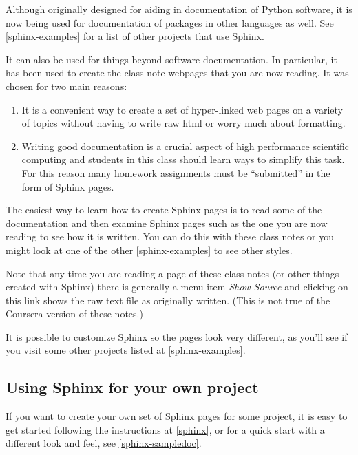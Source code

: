 \documentclass[letterpaper,10pt,english]{sphinxmanual}
\begin{document}
Although originally designed for aiding in documentation of Python software,
it is now being used for documentation of packages in other languages as
well.  See {\hyperref[biblio:sphinx-examples]{{[}sphinx-examples{]}}} for a list of other projects that use Sphinx.

It can also be used for things beyond software documentation.  In
particular, it has been used to create the class note webpages that you are
now reading.  It was chosen for two main reasons:
\begin{enumerate}
\item {} 
It is a convenient way to create a set of hyper-linked web pages on a variety
of topics without having to write raw html or worry much about formatting.

\item {} 
Writing good documentation is a crucial aspect of high performance
scientific computing and students in this class should learn ways to
simplify this task.  For this reason many homework assignments must be
``submitted'' in the form of Sphinx pages.

\end{enumerate}

The easiest way to learn how to create Sphinx pages is to read some of the
documentation
and then examine Sphinx pages such as the one you are now reading to see how
it is written.  You can do this with these class notes or you might look at
one of the other {\hyperref[biblio:sphinx-examples]{{[}sphinx-examples{]}}} to see other styles.

Note that any time you are reading a page of these class notes (or other
things created with Sphinx) there is generally a menu item \emph{Show Source}
and clicking on
this link shows the raw text file as originally written.
(This is not true of the Coursera version of these notes.)

It is possible to customize Sphinx so the pages look very different, as
you'll see if you visit some other projects listed at {\hyperref[biblio:sphinx-examples]{{[}sphinx-examples{]}}}.


\subsection{Using Sphinx for your own project}
\label{sphinx:using-sphinx-for-your-own-project}
If you want to create your own set of Sphinx pages for some project, it is
easy to get started following the instructions at {\hyperref[biblio:sphinx]{{[}sphinx{]}}}, or for a quick
start with a different look and feel, see {\hyperref[biblio:sphinx-sampledoc]{{[}sphinx-sampledoc{]}}}.
\end{document}
